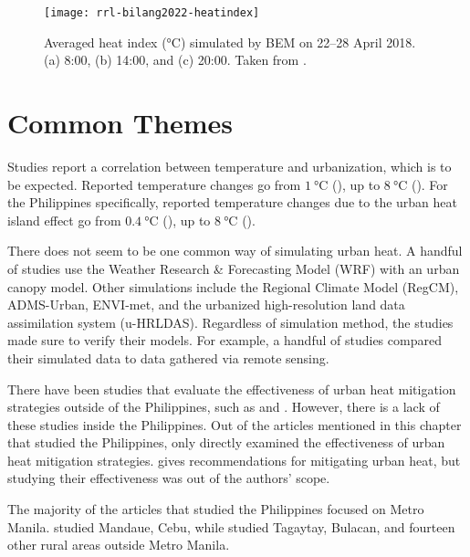 		\begin{figure}
			\centering
			\texttt{[image: rrl-bilang2022-heatindex]}
			\caption{
				Averaged heat index (\unit{\degreeCelsius}) simulated by BEM on 22–28 April 2018.
				(a) 8:00, (b) 14:00, and (c) 20:00.
				Taken from \textcite{Bilang2022}.
			}
			\label{fig:rrl-bilang2022-heatindex}
			
		\end{figure}

\section{Common Themes}
	Studies report a correlation between temperature and urbanization, which is to be expected.
	Reported temperature changes go from $\qty{1}{\degreeCelsius}$ (\cite{Huszar2018a}), 
		up to $\qty{8}{\degreeCelsius}$ (\cite{Wang2019}).
	For the Philippines specifically, reported temperature changes due to the urban heat island effect go from $\qty{0.4}{\degreeCelsius}$ (\cite{Oliveros2019}),
		up to $\qty{8}{\degreeCelsius}$ (\cite{Bilang2022}).
	
	There does not seem to be one common way of simulating urban heat.
	A handful of studies use the Weather Research \& Forecasting Model (WRF) with an urban canopy model.
	Other simulations include the Regional Climate Model (RegCM),
		ADMS-Urban, 
		ENVI-met, and
		the urbanized high-resolution land data assimilation system (u-HRLDAS).
	Regardless of simulation method, the studies made sure to verify their models. For example, a handful of studies compared their simulated data to data gathered via remote sensing.
	
	There have been studies that evaluate the effectiveness of urban heat mitigation strategies outside of the Philippines, such as \textcite{Gao2019} and \textcite{Gao2020}. 
	However, there is a lack of these studies inside the Philippines.
	Out of the articles mentioned in this chapter that studied the Philippines, only \textcite{Cortes2022} directly examined the effectiveness of urban heat mitigation strategies.
	\textcite{Purio2022} gives recommendations for mitigating urban heat, but studying their effectiveness was out of the authors' scope.
	
	The majority of the articles that studied the Philippines focused on Metro Manila.
	\textcite{Cortes2022} studied Mandaue, Cebu, while \textcite{Oliveros2019} studied Tagaytay, Bulacan, and fourteen other rural areas outside Metro Manila.
	
		
